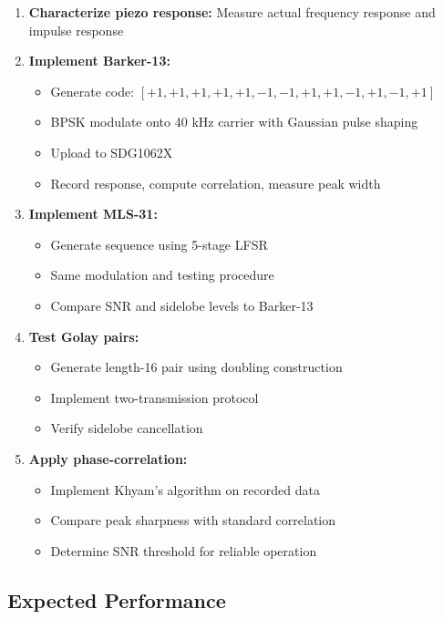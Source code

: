 \documentclass[11pt]{article}
\begin{document}
\begin{enumerate}
    \item \textbf{Characterize piezo response:} Measure actual frequency response and impulse response

    \item \textbf{Implement Barker-13:}
    \begin{itemize}
        \item Generate code: $[+1,+1,+1,+1,+1,-1,-1,+1,+1,-1,+1,-1,+1]$
        \item BPSK modulate onto 40 kHz carrier with Gaussian pulse shaping
        \item Upload to SDG1062X
        \item Record response, compute correlation, measure peak width
    \end{itemize}

    \item \textbf{Implement MLS-31:}
    \begin{itemize}
        \item Generate sequence using 5-stage LFSR
        \item Same modulation and testing procedure
        \item Compare SNR and sidelobe levels to Barker-13
    \end{itemize}

    \item \textbf{Test Golay pairs:}
    \begin{itemize}
        \item Generate length-16 pair using doubling construction
        \item Implement two-transmission protocol
        \item Verify sidelobe cancellation
    \end{itemize}

    \item \textbf{Apply phase-correlation:}
    \begin{itemize}
        \item Implement Khyam's algorithm on recorded data
        \item Compare peak sharpness with standard correlation
        \item Determine SNR threshold for reliable operation
    \end{itemize}
\end{enumerate}

\subsection{Expected Performance}
\end{document}
